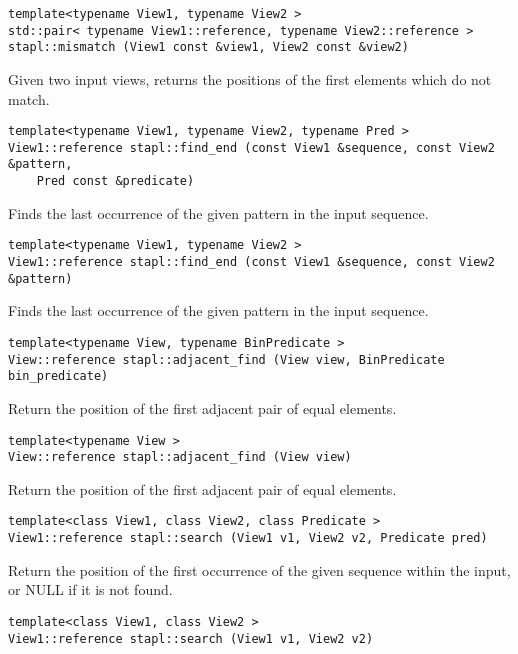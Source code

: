 \begin{verbatim}
template<typename View1, typename View2 >
std::pair< typename View1::reference, typename View2::reference >
stapl::mismatch (View1 const &view1, View2 const &view2)
\end{verbatim}

Given two input views, returns the positions of the first elements which do not match.

\begin{verbatim}
template<typename View1, typename View2, typename Pred >
View1::reference stapl::find_end (const View1 &sequence, const View2 &pattern,
    Pred const &predicate)
\end{verbatim}

Finds the last occurrence of the given pattern in the input sequence.

\begin{verbatim}
template<typename View1, typename View2 >
View1::reference stapl::find_end (const View1 &sequence, const View2 &pattern)
\end{verbatim}

Finds the last occurrence of the given pattern in the input sequence.

\begin{verbatim}
template<typename View, typename BinPredicate >
View::reference stapl::adjacent_find (View view, BinPredicate bin_predicate)
\end{verbatim}

Return the position of the first adjacent pair of equal elements.

\begin{verbatim}
template<typename View >
View::reference stapl::adjacent_find (View view)
\end{verbatim}

Return the position of the first adjacent pair of equal elements.

\begin{verbatim}
template<class View1, class View2, class Predicate >
View1::reference stapl::search (View1 v1, View2 v2, Predicate pred)
\end{verbatim}

Return the position of the first occurrence of the given sequence within the input, or NULL if it is not found.

\begin{verbatim}
template<class View1, class View2 >
View1::reference stapl::search (View1 v1, View2 v2)
\end{verbatim}

